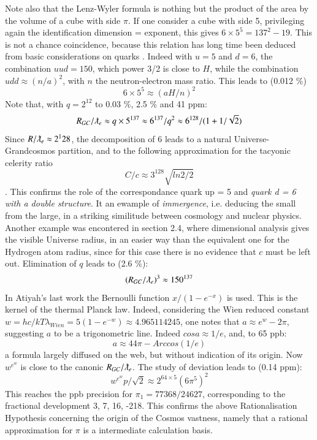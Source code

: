 \documentclass[twoside,draft]{article}
\begin{document}
\begin{sloppypar}
{Note also that the Lenz-Wyler formula is nothing but the product of the area by the volume of a cube with side $\pi $. If one consider a cube with side 5, privileging again the identification dimension = exponent, this gives $6 \times 5^5 = 137^2 - 19 $. This is not a chance coincidence, because this relation has long time been deduced from basic considerations on quarks \cite{Sanchez1}. Indeed with $u = 5 $ and $d = 6 $, the combination $uud = 150 $, which power 3/2 is close to $H$, while the combination $udd \approx (n/a)^2 $, with $n$ the neutron-electron mass ratio. This leads to (0.012 \%) $$6\times 5^5 \approx (aH/n)^2 $$  
Note that, with $q = 2^{12}$ to 0.03 \%, 2.5 \% and 41 ppm:
$$R_{GC}/\lambdabar_e \approx q\times 5^{137} \approx 6^{137}/q^2 \approx 6^{128}/(1+1/\sqrt2)$$
Since $R/\lambdabar_e \approx 2^128$, the decomposition of 6 leads to a natural Universe-Grandcosmos partition, and to the following approximation for the tacyonic celerity ratio $$ C/c\approx3^{128} \sqrt{ln2/2}$$. This confirms the role of the correspondance quark up = 5 and \textit{quark d = 6 with a double structure}. It an ewample of \textit{immergence}, i.e. deducing the small from the large, in a striking similitude between cosmology and nuclear physics. Another example was encontered in section 2.4, where dimensional analysis gives the visible Universe radius, in an easier way than the equivalent one for the Hydrogen atom radius, since for this case there is no evidence that $c$ must be left out.
Elimination of $q$ leads to (2.6 \%):
$$(R_{GC}/\lambdabar_e)^3 \approx 150^{137}$$
 In Atiyah's last work the Bernoulli function $x/(1-e^{-x})$ is used. This is the kernel of the thermal Planck law. Indeed, considering the Wien reduced constant $w = hc/kT\lambda_{Wien} = 5 (1-e^{-w}) \approx 4.965114245$, one notes that $a \approx e^w -2\pi$, suggesting $a$ to be a trigonometric line. Indeed $cosa \approx 1/e$, and, to 65 ppb:
\begin{equation}
a \approx 44\pi - Arccos(1/e)
\end{equation}
a formula largely diffused on the web, but without indication of its origin. Now $w^{e^w}$ is close to the canonic $R_{GC}/\lambdabar_e$. The study of deviation leads to (0.14 ppm):
$$w^{e^w} p/\sqrt2 \approx 2^{64\times5} (6\pi^5)^2$$
This reaches the ppb precision for $\pi_1 = 77368/24627$, corresponding to the fractional development 3, 7, 16, -218. This confirms the above Rationalisation Hypothesis concerning the origin of the Cosmos vastness, namely
that a rational approximation for $\pi$ is a intermediate calculation basis. 

}
\end{sloppypar}
\end{document}
